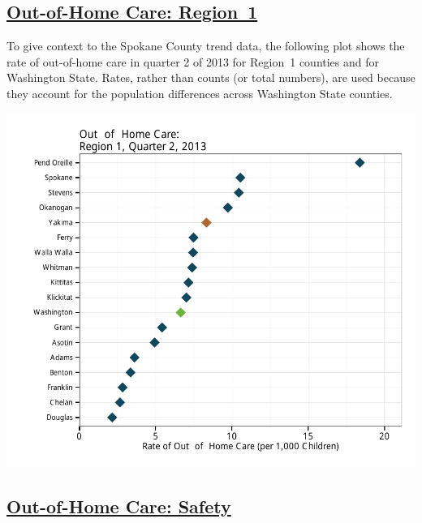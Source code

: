 \documentclass{article}\usepackage[]{graphicx}\usepackage[]{color}
\makeatletter
\def\maxwidth{ %
  \ifdim\Gin@nat@width>\linewidth
    \linewidth
  \else
    \Gin@nat@width
  \fi
}
\newenvironment{knitrout}{}{} %
\makeatother
\begin{document}
\begin{minipage}{\textwidth}
\subsection{\href{http://www.partnersforourchildren.org/child-well-being/visualizations/out-home-care/trends}
    {Out-of-Home Care: Region~1}
}
To give context to the Spokane County trend data, the following plot shows the rate of out-of-home care in quarter 2 of 2013 for Region~1 counties and for Washington State. Rates, rather than counts (or total numbers), are used because they account for the population differences across Washington State counties.\\[1pt]
\begin{knitrout}
\color{fgcolor}

{\centering \includegraphics[width=\maxwidth]{figure/ooh_context} 

}



\end{knitrout}

\end{minipage}
\newpage

\subsection{\href{http://www.partnersforourchildren.org/child-well-being/visualizations/out-home-care/safety}
    {Out-of-Home Care: Safety}
}
\end{document}

